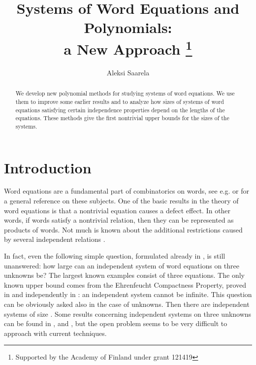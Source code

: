\documentclass[submission]{eptcs}
\theoremstyle{definition}
\begin{document}
\title{Systems of Word Equations and Polynomials: \\ a New Approach
    \thanks{Supported by the Academy of Finland under grant 121419}
}
\author{Aleksi Saarela  }
\def\titlerunning{Systems of Word Equations and Polynomials: a New Approach}
\def\authorrunning{Aleksi Saarela}

\maketitle

\begin{abstract}
We develop new polynomial methods for studying systems of word
equations. We use them to improve some earlier results and to
analyze how sizes of systems of word equations satisfying certain
independence properties depend on the lengths of the equations.
These methods give the first nontrivial upper bounds for the sizes
of the systems.
\end{abstract}

\section{Introduction}

Word equations are a fundamental part of combinatorics on words, see
e.g. \cite{Lo83} or \cite{ChKa97} for a general reference on these
subjects. One of the basic results in the theory of word equations
is that a nontrivial equation causes a defect effect. In other
words, if  words satisfy a nontrivial relation, then they can be
represented as products of  words. Not much is known about the
additional restrictions caused by several independent relations
\cite{HaKa04}.

In fact, even the following simple question, formulated already in
\cite{CuKa83}, is still unanswered: how large can an independent
system of word equations on three unknowns be? The largest known
examples consist of three equations. The only known upper bound
comes from the Ehrenfeucht Compactness Property, proved in
\cite{AlLa85} and independently in \cite{Gu86}: an independent
system cannot be infinite. This question can be obviously asked also
in the case of  unknowns. Then there are independent systems
of size  \cite{KaPl96}. Some results concerning
independent systems on three unknowns can be found in \cite{HaNo03},
\cite{CzKa07} and \cite{CzPl09}, but the open problem seems to be
very difficult to approach with current techniques.
\end{document}
